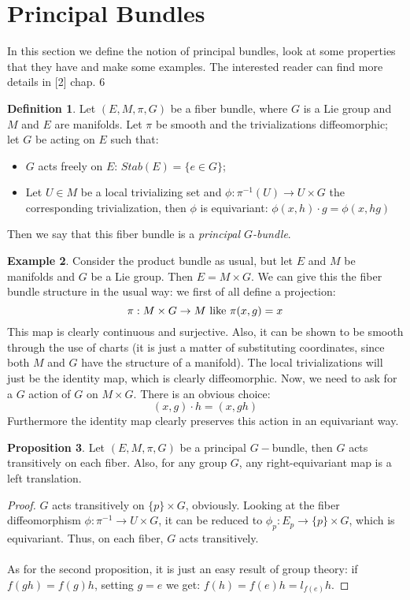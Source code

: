 \documentclass[12pt,a4paper]{report}
\theoremstyle{definition}
\newtheorem{Def}{Definition}[chapter]
\theoremstyle{Theorem}
\newtheorem{Prop}[Def]{Proposition}
\theoremstyle{definition}
\newtheorem{Ex}[Def]{Example}
\theoremstyle{definition}
\begin{document}
	\section{Principal Bundles}
	In this section we define the notion of principal bundles, look at some properties that they have and make some examples. The interested reader can find more details in [2] chap. 6
	\begin{Def}
		Let $(E,M,\pi,G)$ be a fiber bundle, where $G$ is a Lie group and $M$ and $E$ are manifolds. Let $\pi$ be smooth and the trivializations diffeomorphic; let $G$ be acting on $E$ such that:
		\begin{itemize}
			\item $G$ acts freely on $E$: $Stab(E)=\{e\in G\}$;
			\item Let $U\in M$ be a local trivializing set and $\phi:\pi^{-1}(U)\rightarrow U\times G$  the corresponding trivialization, then $\phi$ is equivariant: $\phi(x,h)\cdot g=\phi(x,hg)$
		\end{itemize} 
		Then we say that this fiber bundle is a \textit{principal $G$-bundle}.
	\end{Def}
	\begin{Ex}
		Consider the product bundle as usual, but let $E$ and $M$ be manifolds and $G$ be a Lie group. Then $E=M\times G$. We can give this the fiber bundle structure in the usual way: we first of all define a projection:
		$$\pi:M\times G\rightarrow M\hbox{ like }\pi(x,g)=x$$
		This map is clearly continuous and surjective. Also, it can be shown to be smooth through the use of charts (it is just a matter of substituting coordinates, since both $M$ and $G$ have the structure of a manifold). The local trivializations will just be the identity map, which is clearly diffeomorphic. Now, we need to ask for a $G$ action of $G$ on $M\times G$. There is an obvious choice:
		$$(x,g)\cdot h=(x,gh)$$
		Furthermore the identity map clearly preserves this action in an equivariant way.
	\end{Ex}
	\begin{Prop} \label{Prop_3.5.1}
		Let $(E,M,\pi,G)$ be a principal $G-$bundle, then $G$ acts transitively on each fiber. Also, for any group $G$, any right-equivariant map is a left translation.
	\end{Prop}
	\begin{proof}
		$G$ acts transitively on $\{p\} \times G$, obviously. Looking at the fiber diffeomorphism $\phi:\pi^{-1}\rightarrow U\times G$, it can be reduced to $\phi_p:E_p\rightarrow \{p\}\times G$, which is equivariant. Thus, on each fiber, $G$ acts transitively.\\
		\\
		As for the second proposition, it is just an easy result of group theory: if $f(gh)=f(g)h$, setting $g=e$ we get: $f(h)=f(e)h=l_{f(e)}h$.
	\end{proof}
\end{document}
